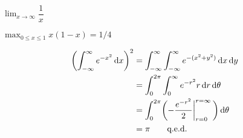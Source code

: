 \documentclass[12pt]{article}
\newcommand*\diff{\mathop{}\!\mathrm{d}}
\begin{document}
$\lim_{x\to\infty}\dfrac{1}{x}$

 $\max_{0\le x\le 1}x(1-x)=1/4$


\begin{align*}
\biggl(\int_{-\infty}^\infty e^{-x^2}\diff x\biggr)^2 
  &= \int_{-\infty}^\infty\int_{-\infty}^\infty e^{-(x^2+y^2)}\diff x\diff y \\
  &= \int_0^{2\pi}\int_0^\infty e^{-r^2}r\diff r\diff\theta                  \\
  &= \int_0^{2\pi}\biggl(-{e^{-r^2}\over2}\bigg\vert_{r=0}^{r=\infty}\,\biggr)\diff\theta\\
  &= \pi                                          \tag*{q.e.d.}
\end{align*}
\end{document}
